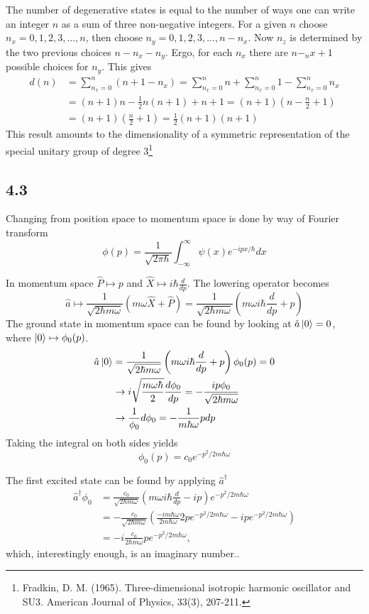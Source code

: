 \documentclass{article}
\begin{document}
The number of degenerative states is equal to the number of ways one can write an integer $n$ as a sum of three non-negative integers. For a given $n$ choose $n_x=0,1,2,3,...,n$, then choose $n_y=0,1,2,3,...,n-n_x$. Now $n_z$ is determined by the two previous choices $n-n_x-n_y$. Ergo, for each $n_x$ there are $n-_nx+1$ possible choices for $n_y$. This gives
\begin{align*}
d(n)&=\sum_{n_x=0}^n (n+1-n_x) = \sum_{n_x=0}^n n  +\sum_{n_x=0}^n 1 - \sum_{n_x=0}^n n_x \\
&= (n+1)n-\frac{1}{2}n(n+1)+n+1 = (n+1)\left(n-\frac{n}{2}+1 \right) \\
&= (n+1)\left(\frac{n}{2} +1\right) = \frac{1}{2}(n+1)(n+1)
\end{align*}
This result amounts to the dimensionality of a symmetric representation of the special unitary group of degree 3\footnote{Fradkin, D. M. (1965). Three-dimensional isotropic harmonic oscillator and SU3. American Journal of Physics, 33(3), 207-211.}

\subsection*{4.3}
Changing from position space to momentum space is done by way of Fourier transform
\begin{equation}
\phi(p)=\frac{1}{\sqrt{2\pi\hbar}}\int_{-\infty}^{\infty}\psi(x)e^{-ipx/\hbar}dx
\end{equation}

In momentum space $\hat{P}\mapsto p$ and $\hat{X}\mapsto i\hbar\frac{d}{dp}$. The lowering operator becomes
\begin{equation}
\hat{a} \mapsto \frac{1}{\sqrt{2\hbar m\omega}}\left(m\omega \hat{X}+\hat{P} \right)=\frac{1}{\sqrt{2\hbar m\omega}}\left(m\omega i\hbar\frac{d}{dp}+p \right)
\end{equation}
The ground state in momentum space can be found by looking at $\hat{a}\ket{0}=0$, where $\ket{0} \mapsto \phi_0(p)$.
\begin{align*}
\hat{a}\ket{0} &= \frac{1}{\sqrt{2\hbar m\omega}}\left(m\omega i\hbar\frac{d}{dp}+p \right)\phi_0(p)=0 \\
&\rightarrow i \sqrt{\frac{m\omega\hbar}{2}}\frac{d\phi_0}{dp}=-\frac{ip\phi_0}{\sqrt{2\hbar m \omega}} \\
&\rightarrow \frac{1}{\phi_0}d\phi_0=-\frac{1}{m\hbar\omega}pdp
\end{align*}
Taking the integral on both sides yields
\begin{equation}
\phi_0(p)=c_0e^{-p^2/2m\hbar\omega}
\end{equation}

The first excited state can be found by applying $\hat{a}^{\dagger}$
\begin{align*}
\hat{a}^{\dagger}\phi_0 &=\frac{c_0}{\sqrt{2\hbar m\omega}}\left(m\omega i\hbar\frac{d}{dp} -ip\right)e^{-p^2/2m\hbar\omega} \\
&= -\frac{c_0}{\sqrt{2\hbar m\omega}}\left(\frac{-im\hbar\omega}{2m\hbar\omega}2pe^{-p^2/2m\hbar\omega} -ipe^{-p^2/2m\hbar\omega}\right) \\
&= -i\frac{c_0}{2\hbar m\omega}pe^{-p^2/2m\hbar\omega},
\end{align*}
which, interestingly enough, is an imaginary number..
\end{document}

